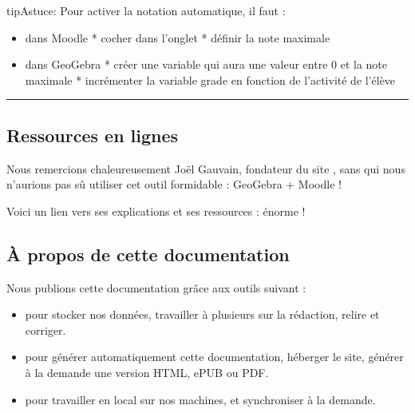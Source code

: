 \documentclass[letterpaper,10pt,french]{sphinxmanual}
\begin{document}
\begin{sphinxadmonition}{tip}{Astuce:}
Pour activer la notation automatique, il faut :
\begin{itemize}
\item {} 
dans Moodle
* cocher  dans l’onglet 
* définir la note maximale

\item {} 
dans GeoGebra
* créer une variable  qui aura une valeur entre 0 et la note maximale
* incrémenter la variable grade en fonction de l’activité de l’élève

\end{itemize}

\noindent{}

\end{sphinxadmonition}


\bigskip\hrule\bigskip



\subsection{Ressources en lignes}
\label{\detokenize{projet-ressources:ressources-en-lignes}}\label{\detokenize{projet-ressources::doc}}
Nous remercions chaleureusement Joël Gauvain, fondateur du site , sans qui nous n’aurions pas sû utiliser cet outil formidable : GeoGebra + Moodle !

Voici un lien vers ses explications et ses ressources : énorme !



\subsection{À propos de cette documentation}
\label{\detokenize{projet-aPropos:a-propos-de-cette-documentation}}\label{\detokenize{projet-aPropos::doc}}
Nous publions cette documentation grâce aux outils suivant :
\begin{itemize}
\item {} 
 pour stocker nos données, travailler à plusieurs sur la rédaction,
relire et corriger.

\item {} 
 pour générer automatiquement cette documentation, héberger le site,
générer à la demande une version HTML, ePUB ou PDF.

\item {} 
 pour travailler en local sur nos machines, et synchroniser à la demande.

\end{itemize}
\end{document}
